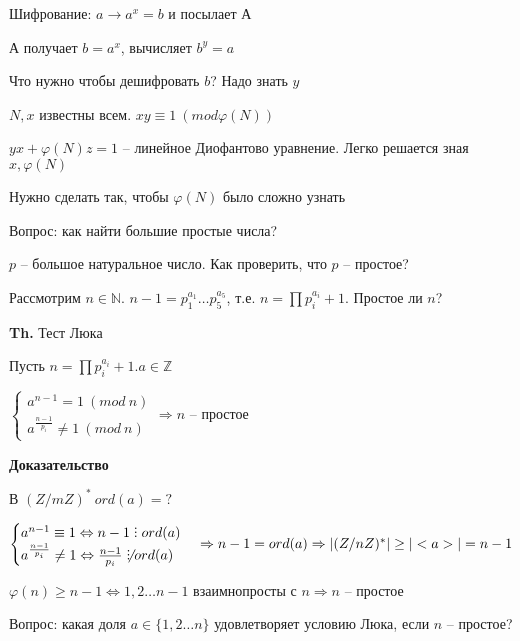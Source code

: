 \documentclass[14pt, letter paper]{article}
\DeclareRobustCommand{\divby}{%
  \mathrel{\text{\vbox{\baselineskip.65ex\lineskiplimit0pt\hbox{.}\hbox{.}\hbox{.}}}}%
}
\begin{document}
Шифрование: $a \rightarrow a^x = b$ и посылает А

А получает $b = a^x$, вычисляет $b^y = a$

\vspace{5mm}

Что нужно чтобы дешифровать $b$? Надо знать $y$

$N, x$ известны всем. $xy \equiv 1\ (mod \varphi(N))$

$yx + \varphi(N)z = 1$ -- линейное Диофантово уравнение. Легко решается зная $x, \varphi(N)$

Нужно сделать так, чтобы $\varphi(N)$ было сложно узнать

\vspace{5mm}

Вопрос: как найти большие простые числа?

$p$ -- большое натуральное число. Как проверить, что $p$ -- простое?

Рассмотрим $n \in \mathds{N}$. $n - 1 = p_1^{a_1} \ldots p_5^{a_5}$, т.е. $n = \prod p_i^{a_i} + 1$. Простое ли $n$?

\vspace{5mm}

\textbf{Th.} Тест Люка

Пусть $n = \prod p_i^{a_i} + 1. a \in \mathds{Z}$

$\begin{cases}
    a^{n-1} = 1\ (mod\ n)\\
    a^\frac{n-1}{p_i} \neq 1\ (mod\ n)
\end{cases} \Rightarrow n$ -- простое

\begin{center}
    \textbf{Доказательство}
\end{center}

В $(Z/mZ)^*\ ord(a) = ?$

$\begin{cases}
    a^{n-1} \equiv 1 \Leftrightarrow n - 1 \divby ord(a) \\
    a^\frac{n-1}{p_i} \neq 1 \Leftrightarrow \frac{n-1}{p_i} \not\divby ord(a)
\end{cases} \Rightarrow n - 1 = ord(a) \Rightarrow |(Z/nZ)^*| \geq |<a>| = n - 1$

$\varphi(n) \geq n - 1 \Leftrightarrow 1, 2 \ldots n-1$ взаимнопросты с $n \Rightarrow n$ -- простое

\vspace{5mm}

Вопрос: какая доля $a \in \{1, 2 \ldots n\}$ удовлетворяет условию Люка, если $n$ -- простое?
\end{document}
